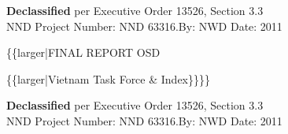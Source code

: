 \begin{spacing}{0.7}
\begin{center}
\begin{scriptsize}\textbf{Declassified} per Executive Order 13526, Section 3.3\\NND Project Number: NND 63316.By: NWD Date: 2011
\end{scriptsize}
\end{center}
\end{spacing}
\begin{center}
\{\{larger|FINAL REPORT OSD\end{center}
\{\{larger|Vietnam Task Force \& Index\}\}\}\}\begin{spacing}{0.7}
\begin{center}
\begin{scriptsize}\textbf{Declassified} per Executive Order 13526, Section 3.3\\NND Project Number: NND 63316.By: NWD Date: 2011
\end{scriptsize}
\end{center}
\end{spacing}